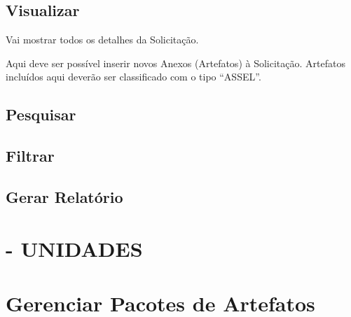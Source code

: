 		
		
	
	
	

	
	





	\subsection{Visualizar}

	Vai mostrar todos os detalhes da Solicitação.
	
	Aqui deve ser possível inserir novos Anexos (Artefatos) à Solicitação. Artefatos incluídos aqui deverão ser classificado com o tipo ``ASSEL''.
	 

	\subsection{Pesquisar}
	\subsection{Filtrar}
	\subsection{Gerar Relatório}


\section{ \msrlv - UNIDADES}









\section{Gerenciar Pacotes de Artefatos \msrln}


